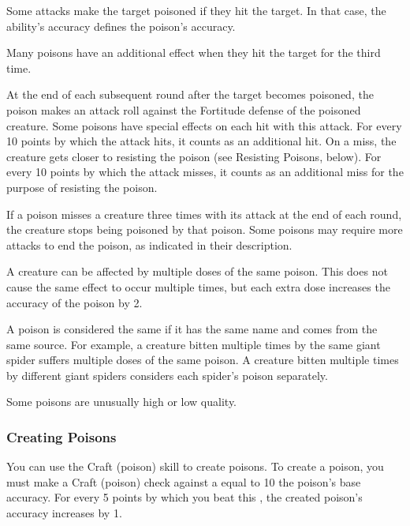             Some attacks make the target poisoned if they hit the target.
            In that case, the ability's accuracy defines the poison's accuracy.

            Many poisons have an additional effect when they hit the target for the third time.

            At the end of each subsequent round after the target becomes poisoned, the poison makes an attack roll against the Fortitude defense of the poisoned creature.
            Some poisons have special effects on each hit with this attack.
            For every 10 points by which the attack hits, it counts as an additional hit.
            On a miss, the creature gets closer to resisting the poison (see Resisting Poisons, below).
            For every 10 points by which the attack misses, it counts as an additional miss for the purpose of resisting the poison.

            If a poison misses a creature three times with its attack at the end of each round, the creature stops being poisoned by that poison.
            Some poisons may require more attacks to end the poison, as indicated in their description.

            A creature can be affected by multiple doses of the same poison.
            This does not cause the same effect to occur multiple times, but each extra dose increases the accuracy of the poison by 2.

            A poison is considered the same if it has the same name and comes from the same source.
            For example, a creature bitten multiple times by the same giant spider suffers multiple doses of the same poison.
            A creature bitten multiple times by different giant spiders considers each spider's poison separately.

             Some poisons are unusually high or low quality.

        \subsubsection{Creating Poisons}\label{Creating Poisons}

            You can use the Craft (poison) skill to create poisons.
            To create a poison, you must make a Craft (poison) check against a  equal to 10 \add the poison's base accuracy.
            For every 5 points by which you beat this , the created poison's accuracy increases by 1.

